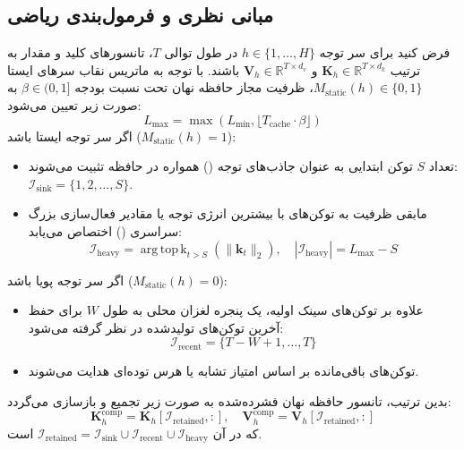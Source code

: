 \subsection{مبانی نظری و فرمول‌بندی ریاضی}
فرض کنید برای سر توجه $h \in \{1, \dots, H\}$ در طول توالی $T$، تانسورهای کلید و مقدار به ترتیب $\mathbf{K}_h \in \mathbb{R}^{T \times d_k}$ و $\mathbf{V}_h \in \mathbb{R}^{T \times d_v}$ باشند. با توجه به ماتریس نقاب سرهای ایستا $M_{\text{static}}(h) \in \{0, 1\}$، ظرفیت مجاز حافظه نهان تحت نسبت بودجه $\beta \in (0, 1]$ به صورت زیر تعیین می‌شود:
\begin{equation}
L_{\text{max}} = \max\left(L_{\text{min}}, \lfloor T_{\text{cache}} \cdot \beta \rfloor \right)
\end{equation}
اگر سر توجه ایستا باشد ($M_{\text{static}}(h) = 1$):
\begin{itemize}
    \item تعداد $S$ توکن ابتدایی به عنوان جاذب‌های توجه () همواره در حافظه تثبیت می‌شوند: $\mathcal{I}_{\text{sink}} = \{1, 2, \dots, S\}$.
    \item مابقی ظرفیت به توکن‌های با بیشترین انرژی توجه یا مقادیر فعال‌سازی بزرگ سراسری () اختصاص می‌یابد:
    \begin{equation}
    \mathcal{I}_{\text{heavy}} = \operatorname{arg\,top\,k}_{t > S} \left( \|\mathbf{k}_t\|_2 \right), \quad |\mathcal{I}_{\text{heavy}}| = L_{\text{max}} - S
    \end{equation}
\end{itemize}
اگر سر توجه پویا باشد ($M_{\text{static}}(h) = 0$):
\begin{itemize}
    \item علاوه بر توکن‌های سینک اولیه، یک پنجره لغزان محلی به طول $W$ برای حفظ آخرین توکن‌های تولیدشده در نظر گرفته می‌شود:
    \begin{equation}
    \mathcal{I}_{\text{recent}} = \{T - W + 1, \dots, T\}
    \end{equation}
    \item توکن‌های باقی‌مانده بر اساس امتیاز تشابه یا هرس توده‌ای هدایت می‌شوند.
\end{itemize}
بدین ترتیب، تانسور حافظه نهان فشرده‌شده به صورت زیر تجمیع و بازسازی می‌گردد:
\begin{equation}
\mathbf{K}_{h}^{\text{comp}} = \mathbf{K}_{h}[\mathcal{I}_{\text{retained}}, :], \quad \mathbf{V}_{h}^{\text{comp}} = \mathbf{V}_{h}[\mathcal{I}_{\text{retained}}, :]
\end{equation}
که در آن $\mathcal{I}_{\text{retained}} = \mathcal{I}_{\text{sink}} \cup \mathcal{I}_{\text{recent}} \cup \mathcal{I}_{\text{heavy}}$ است.

